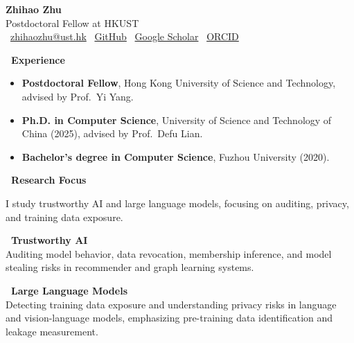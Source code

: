 \documentclass[10pt]{article}
\newcommand{\sectionline}{\par\vspace{4pt}{\color{linecolor}\hrule height 0.6pt}\par\vspace{6pt}}
\begin{document}
\begin{tcolorbox}[
  enhanced,
  colback=primary,
  colframe=primary,
  boxrule=0pt,
  arc=0pt,
  left=0pt, right=0pt, top=10pt, bottom=10pt,
  boxsep=0pt,
  width=\linewidth+3.2cm,
  enlarge left by=-1.6cm,
  enlarge right by=-1.6cm,
]
\begin{center}
  {\fontsize{26}{30}\selectfont\color{white}\textbf{Zhihao Zhu}}\\[4pt]
  {\normalsize\color{white!90}Postdoctoral Fellow at HKUST}\\[8pt]
  {\color{white!80}\small
    ~\href{mailto:zhihaozhu@ust.hk}{zhihaozhu@ust.hk} \quad
    ~\href{https://github.com/zzh9568}{GitHub} \quad
    ~\href{https://scholar.google.com/citations?user=745H-yoAAAAJ}{Google Scholar} \quad
    ~\href{https://orcid.org/0000-0001-5814-1939}{ORCID}
  }
\end{center}
\end{tcolorbox}

\vspace{6pt}

\textbf{\normalsize\color{primary}~Experience}
\sectionline
\begin{itemize}[leftmargin=1.2em, itemsep=2pt, topsep=0pt, parsep=0pt]
  \item {\small\textbf{Postdoctoral Fellow}}, Hong Kong University of Science and Technology, advised by Prof.~Yi Yang.
  \item {\small\textbf{Ph.D. in Computer Science}}, University of Science and Technology of China (2025), advised by Prof.~Defu Lian.
  \item {\small\textbf{Bachelor's degree in Computer Science}}, Fuzhou University (2020).
\end{itemize}

\vspace{4pt}

\textbf{\normalsize\color{primary}~Research Focus}
\sectionline
{\small I study trustworthy AI and large language models, focusing on auditing, privacy, and training data exposure.}

\vspace{4pt}

\begin{multicols}{2}
\noindent\textbf{\small\color{primary}~Trustworthy AI}\\[2pt]
{\small Auditing model behavior, data revocation, membership inference, and model stealing risks in recommender and graph learning systems.}

\columnbreak

\noindent\textbf{\small\color{primary}~Large Language Models}\\[2pt]
{\small Detecting training data exposure and understanding privacy risks in language and vision-language models, emphasizing pre-training data identification and leakage measurement.}
\end{multicols}
\end{document}
